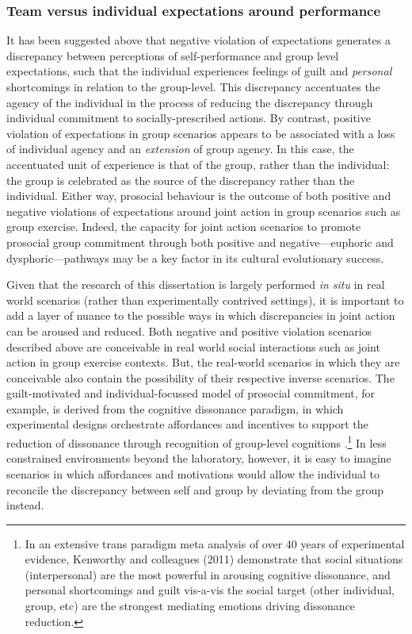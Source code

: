 \begin{CJK}{UTF8}{gbsn}
{\subsubsection{Team versus individual expectations around performance}
It has been suggested above that negative violation of expectations generates a discrepancy between perceptions of self-performance and group level expectations, such that the individual experiences feelings of guilt and \textit{personal} shortcomings in relation to the group-level.   This discrepancy accentuates the agency of the individual in the process of reducing the discrepancy through individual commitment to socially-prescribed actions.  By contrast, positive violation of expectations in group scenarios appears to be associated with a loss of individual agency and an \textit{extension} of group agency.  In this case, the accentuated unit of experience is that of the group, rather than the individual: the group is celebrated as the source of the discrepancy rather than the individual.  Either way, prosocial behaviour is the outcome of both positive and negative violations of expectations around joint action in group scenarios such as group exercise.  Indeed, the capacity for joint action scenarios to promote prosocial group commitment through both positive and negative---euphoric and dysphoric---pathways may be a key factor in its cultural evolutionary success.

Given that the research of this dissertation is largely performed \textit{in situ} in real world scenarios (rather than experimentally contrived settings), it is important to add a layer of nuance to the possible ways in which discrepancies in joint action can be aroused and reduced.  Both negative and positive violation scenarios described above are conceivable in real world social interactions such as joint action in group exercise contexts. But, the real-world scenarios in which they are conceivable also contain the possibility of their respective inverse scenarios.  The guilt-motivated and individual-focussed model of prosocial commitment, for example, is derived from the cognitive dissonance paradigm, in which experimental designs orchestrate affordances and incentives to support the reduction of dissonance through recognition of group-level cognitions \citep{Kenworthy2011}.\footnote{In an extensive trans paradigm meta analysis of over 40 years of experimental evidence, Kenworthy and colleagues (2011) demonstrate that social situations (interpersonal) are the most powerful in arousing cognitive dissonance, and personal shortcomings and guilt vis-a-vis the social target (other individual, group, etc) are the strongest mediating emotions driving dissonance reduction.}  In less constrained environments beyond the laboratory, however, it is easy to imagine scenarios in which affordances and motivations would allow the individual to reconcile the discrepancy between self and group by deviating from the group instead.

}
\end{CJK}
